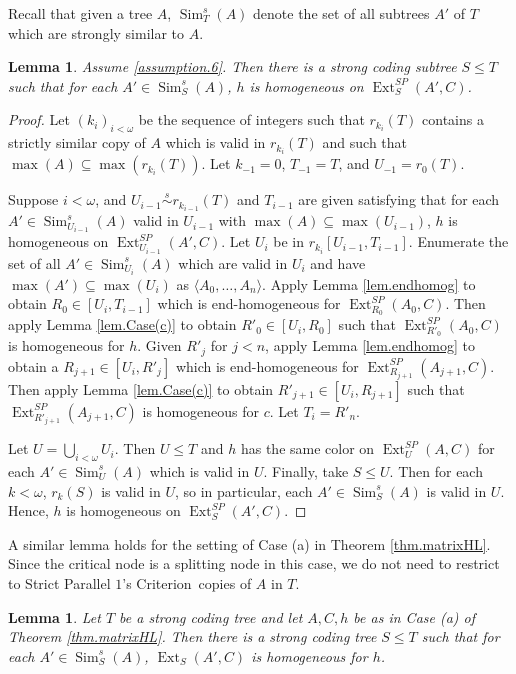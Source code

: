 \documentclass{amsart}
\newtheorem{lem}[thm]{Lemma}
\theoremstyle{remark}
\theoremstyle{definition}
\theoremstyle{remark}
\newcommand{\om}{\omega}
\newcommand{\sse}{\subseteq}
\DeclareMathOperator{\Sim}{Sim}
\DeclareMathOperator{\Ext}{Ext}
\newcommand{\ssim}{\stackrel{s}{\sim}}
\newcommand{\lgl}{\langle}
\newcommand{\rgl}{\rangle}
\newcommand{\SPOC}{Strict Parallel $1$'s Criterion}
\begin{document}
Recall that given a tree $A$, $\Sim^s_T(A)$ denote the set of all subtrees  $A'$ of $T$ which are strongly similar to $A$.



\begin{lem}\label{lem.Case(b)}
Assume \ref{assumption.6}.
Then there is a strong coding subtree $S\le T$ such that for each $A'\in\Sim^s_S(A)$,
$h$ is homogeneous on $\Ext^{SP}_S(A',C)$.
\end{lem}


\begin{proof}
Let $(k_i)_{i<\om}$ be the sequence of integers such that $r_{k_i}(T)$ contains a strictly similar copy  of $A$
which is valid in
$r_{k_i}(T)$ and such that $\max(A)\sse\max(r_{k_i}(T))$.
Let $k_{-1}=0$, $T_{-1}=T$,
and
 $U_{-1}=r_{0}(T)$.


Suppose $i<\om$, and $U_{i-1}\ssim r_{k_{i-1}}(T)$
 and $T_{i-1}$ are given satisfying that for each $A'\in\Sim^s_{U_{i-1}}(A)$ valid in $U_{i-1}$ with $\max(A)\sse \max(U_{i-1})$,
$h$ is homogeneous on $\Ext_{U_{i-1}}^{SP}(A',C)$.
Let $U_i$ be in $r_{k_i}[U_{i-1},T_{i-1}]$.
Enumerate the set of all $A'\in\Sim^s_{U_i}(A)$ which are valid in $U_i$ and have $\max(A')\sse \max(U_i)$ as $\lgl A_0,\dots,A_n\rgl$.
Apply Lemma \ref{lem.endhomog} to obtain  $R_{0}\in [U_i,T_{i-1}]$ which is end-homogeneous for $\Ext^{SP}_{R_0}(A_0,C)$.
Then
apply Lemma \ref{lem.Case(c)} to
obtain $R'_{0}\in [U_i,R_0]$
such that $\Ext^{SP}_{R'_{0}}(A_0,C)$ is homogeneous for $h$.
Given $R'_{j}$  for $j<n$,
apply Lemma \ref{lem.endhomog} to obtain a $R_{j+1}\in [U_i,R'_{j}]$ which is end-homogeneous for $\Ext^{SP}_{R_{j+1}}(A_{j+1},C)$.
Then
apply Lemma \ref{lem.Case(c)} to
obtain $R'_{j+1}\in [U_i,R_{j+1}]$
such that $\Ext^{SP}_{R'_{j+1}}(A_{j+1},C)$ is homogeneous for $c$.
Let $T_i=R'_n$.



Let $U=\bigcup_{i<\om}U_i$.
Then $U\le T$ and $h$ has the same color on $\Ext_U^{SP}(A,C)$
for   each
$A'\in\Sim^s_U(A)$ which is valid in $U$.
Finally, take $S\le U$.
Then for each $k<\om$, $r_k(S)$ is valid in $U$,
so in particular,
 each $A'\in\Sim^s_S(A)$ is valid in $U$.
Hence,
$h$ is homogeneous on  $\Ext_S^{SP}(A',C)$.
\end{proof}


A similar lemma holds for the setting of Case (a) in Theorem \ref{thm.matrixHL}.
Since the critical node is a splitting node in this case,
 we do not need to restrict to \SPOC\ copies of $A$ in $T$.


\begin{lem}\label{lem.fusionsplit}
Let $T$ be a strong coding tree and let $A,C,h$ be as in Case (a) of Theorem \ref{thm.matrixHL}.
Then there is a strong coding tree $S\le T$ such that for each  $A'\in\Sim^s_S(A)$, $\Ext_S(A',C)$ is homogeneous for $h$.
\end{lem}
\end{document}
